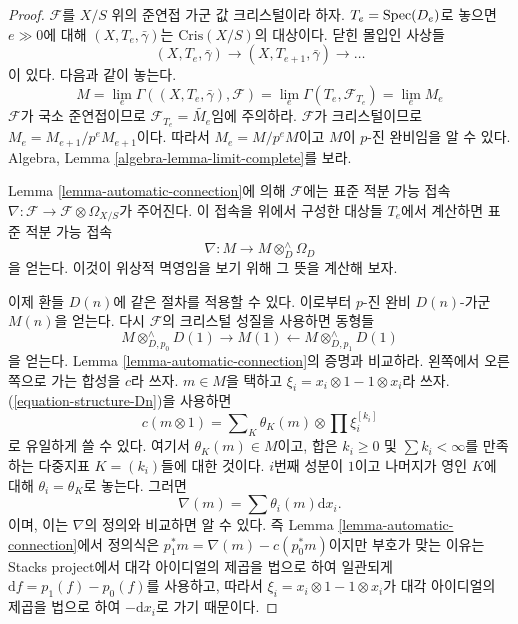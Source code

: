 \begin{proof}
$\mathcal{F}$를 $X/S$ 위의 준연접 가군 값 크리스털이라 하자.
$T_e = \mathop{\mathrm{Spec}}(D_e)$로 놓으면 $e \gg 0$에 대해
$(X, T_e, \bar\gamma)$는 $\text{Cris}(X/S)$의 대상이다. 닫힌 몰입인
사상들
$$
(X, T_e, \bar\gamma) \to (X, T_{e + 1}, \bar\gamma) \to \ldots
$$
이 있다. 다음과 같이 놓는다.
$$
M =
\lim_e \Gamma((X, T_e, \bar\gamma), \mathcal{F}) =
\lim_e \Gamma(T_e, \mathcal{F}_{T_e}) = \lim_e M_e
$$
$\mathcal{F}$가 국소 준연접이므로
$\mathcal{F}_{T_e} = \widetilde{M_e}$임에 주의하라.
$\mathcal{F}$가 크리스털이므로
$M_e = M_{e + 1}/p^eM_{e + 1}$이다. 따라서 $M_e = M/p^eM$이고
$M$이 $p$-진 완비임을 알 수 있다. Algebra, Lemma
\ref{algebra-lemma-limit-complete}를 보라.

\medskip\noindent
Lemma \ref{lemma-automatic-connection}에 의해 $\mathcal{F}$에는
표준 적분 가능 접속
$\nabla : \mathcal{F} \to \mathcal{F} \otimes \Omega_{X/S}$가
주어진다. 이 접속을 위에서 구성한 대상들 $T_e$에서 계산하면
표준 적분 가능 접속
$$
\nabla : M \longrightarrow M \otimes^\wedge_D \Omega_D
$$
을 얻는다. 이것이 위상적 멱영임을 보기 위해 그 뜻을 계산해 보자.

\medskip\noindent
이제 환들 $D(n)$에 같은 절차를 적용할 수 있다. 이로부터 $p$-진
완비 $D(n)$-가군 $M(n)$을 얻는다. 다시 $\mathcal{F}$의 크리스털
성질을 사용하면 동형들
$$
M \otimes^\wedge_{D, p_0} D(1) \rightarrow M(1)
\leftarrow M \otimes^\wedge_{D, p_1} D(1)
$$
을 얻는다. Lemma \ref{lemma-automatic-connection}의 증명과 비교하라.
왼쪽에서 오른쪽으로 가는 합성을 $c$라 쓰자. $m \in M$을 택하고
$\xi_i = x_i \otimes 1 - 1 \otimes x_i$라 쓰자.
(\ref{equation-structure-Dn})을 사용하면
$$
c(m \otimes 1) = \sum\nolimits_K \theta_K(m) \otimes \prod \xi_i^{[k_i]}
$$
로 유일하게 쓸 수 있다. 여기서 $\theta_K(m) \in M$이고, 합은
$k_i \geq 0$ 및 $\sum k_i < \infty$를 만족하는 다중지표
$K = (k_i)$들에 대한 것이다. $i$번째 성분이 $1$이고 나머지가
영인 $K$에 대해 $\theta_i = \theta_K$로 놓는다. 그러면
$$
\nabla(m) = \sum \theta_i(m) \text{d}x_i.
$$
이며, 이는 $\nabla$의 정의와 비교하면 알 수 있다. 즉 Lemma
\ref{lemma-automatic-connection}에서 정의식은
$p_1^*m = \nabla(m) - c(p_0^*m)$이지만 부호가 맞는 이유는
Stacks project에서 대각 아이디얼의 제곱을 법으로 하여 일관되게
$\text{d}f = p_1(f) - p_0(f)$를 사용하고, 따라서
$\xi_i = x_i \otimes 1 - 1 \otimes x_i$가 대각 아이디얼의 제곱을
법으로 하여 $-\text{d}x_i$로 가기 때문이다.


\end{proof}
